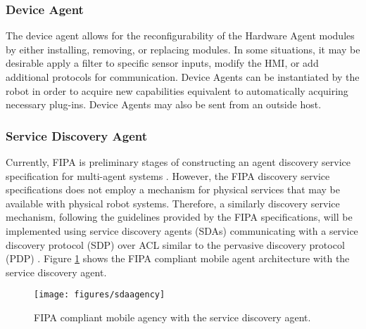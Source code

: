     \subsubsection{Device Agent}
      The device agent allows for the reconfigurability of the Hardware Agent
        modules by either installing, removing, or replacing modules.
      In some situations, it may be desirable apply a filter to specific sensor
        inputs, modify the HMI, or add additional protocols for communication.
      Device Agents can be instantiated by the robot in order to acquire new
        capabilities equivalent to automatically acquiring necessary plug-ins.
      Device Agents may also be sent from an outside host.

    \subsubsection{Service Discovery Agent}
      Currently, FIPA is preliminary stages of constructing an agent discovery 
        service specification for multi-agent systems \cite{FIPA-ADS}.
      However, the FIPA discovery service specifications does not employ a
        mechanism for physical services that may be available with physical
        robot systems.
      Therefore, a similarly discovery service mechanism, following the 
        guidelines provided by the FIPA specifications, will be implemented
        using service discovery agents (SDAs) communicating with
        a service discovery protocol (SDP) over ACL similar to the pervasive 
        discovery protocol (PDP) \cite{Campo2006}.
      Figure \ref{fig:sdaagency} shows the FIPA compliant mobile agent 
        architecture with the service discovery agent.
      \begin{figure}%
      \begin{center}
        \texttt{[image: figures/sdaagency]}
      \end{center}
      \caption{FIPA compliant mobile agency with the service discovery agent.}
      \label{fig:sdaagency}
      \end{figure}
   
